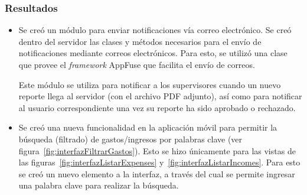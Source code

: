 \subsubsection{Resultados}
\begin{itemize}
\item Se creó un módulo para enviar notificaciones vía correo electrónico. Se creó dentro del servidor las clases y métodos necesarios para el envío de notificaciones mediante correos electrónicos. Para esto, se utilizó una clase que provee el \textit{framework} AppFuse que facilita el envío de correos. 

Este módulo se utiliza para notificar a los supervisores cuando un nuevo reporte llega al servidor (con el archivo PDF adjunto), así como para notificar al usuario correspondiente una vez su reporte ha sido aprobado o rechazado.
\item Se creó una nueva funcionalidad en la aplicación móvil para permitir la búsqueda (filtrado) de gastos/ingresos por palabras clave (ver figura~\ref{fig:interfazFiltrarGastos}). Esto se hizo únicamente para las vistas de las figuras~\ref{fig:interfazListarExpenses} y~\ref{fig:interfazListarIncomes}. Para esto se creó un nuevo elemento a la interfaz, a través del cual se permite ingresar una palabra clave para realizar la búsqueda.
\end{itemize}
%
%
%
%
%

